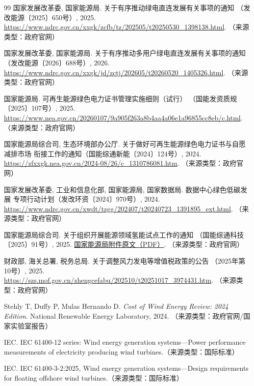 \begin{thebibliography}{99}
国家发展改革委, 国家能源局. 关于有序推动绿电直连发展有关事项的通知
（发改能源〔2025〕650号）, 2025.
\url{https://www.ndrc.gov.cn/xxgk/zcfb/tz/202505/t20250530_1398138.html}.
（来源类型：政府官网）

国家发展改革委, 国家能源局. 关于有序推动多用户绿电直连发展有关事项的通知
（发改能源〔2026〕688号）, 2026.
\url{https://www.ndrc.gov.cn/xxgk/jd/zctj/202605/t20260520_1405326.html}.
（来源类型：政府官网）

国家能源局. 可再生能源绿色电力证书管理实施细则（试行）
（国能发资质规〔2025〕107号）, 2025.
\url{https://www.nea.gov.cn/20260107/9a905f263a8b4aa4a06e1a96855cc8eb/c.html}.
（来源类型：政府官网）

国家能源局综合司, 生态环境部办公厅. 关于做好可再生能源绿色电力证书与自愿减排市场
衔接工作的通知（国能综通新能〔2024〕124号）, 2024.
\url{https://zfxxgk.nea.gov.cn/2024-08/26/c_1310786081.htm}.
（来源类型：政府官网）

国家发展改革委, 工业和信息化部, 国家能源局, 国家数据局. 数据中心绿色低碳发展
专项行动计划（发改环资〔2024〕970号）, 2024.
\url{https://www.ndrc.gov.cn/xwdt/tzgg/202407/t20240723_1391895_ext.html}.
（来源类型：政府官网）

国家能源局综合司. 关于组织开展能源领域氢能试点工作的通知
（国能综通科技〔2025〕91号）, 2025.
\href{https://www.nea.gov.cn/20250610/472b12c43f534aab9a95de81034dcd92/20250610472b12c43f534aab9a95de81034dcd92_2288580504e06346d39eb8d268c8e70947.pdf}{国家能源局附件原文（PDF）}.
（来源类型：政府官网）

财政部, 海关总署, 税务总局. 关于调整风力发电等增值税政策的公告
（2025年第10号）, 2025.
\url{https://szs.mof.gov.cn/zhengcefabu/202510/t20251017_3974431.htm}.
（来源类型：政府官网）

Stehly T, Duffy P, Mulas Hernando D. \emph{Cost of Wind Energy Review: 2024
Edition}. National Renewable Energy Laboratory, 2024.
（来源类型：政府官网/国家实验室报告）

IEC. IEC 61400-12 series: Wind energy generation systems---Power performance
measurements of electricity producing wind turbines.（来源类型：国际标准）

IEC. IEC 61400-3-2:2025, Wind energy generation systems---Design requirements
for floating offshore wind turbines.（来源类型：国际标准）


\end{thebibliography}
